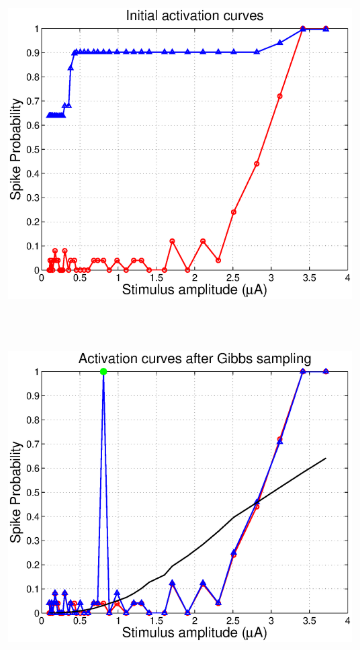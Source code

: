 \documentclass[12pt,letterpaper,fleqn]{article}
\begin{document}
\begin{figure}[ht!]
        \centering
        \begin{subfigure}[b]{0.32\textwidth}
                \includegraphics[width=\textwidth]{Act0.eps}
                \caption{}
        \end{subfigure}%
~\begin{subfigure}[b]{0.32\textwidth}
                \includegraphics[width=\textwidth]{Act2.eps}
                \caption{}
        \end{subfigure}

\end{figure}
\end{document}
